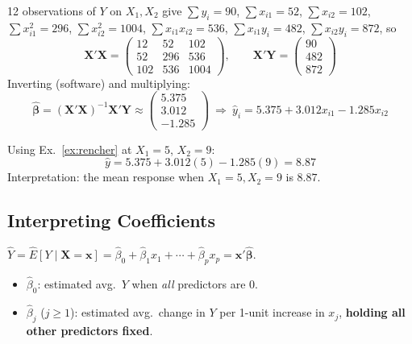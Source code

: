 \begin{example}\label{ex:rencher}
    12 observations of $Y$ on $X_1,X_2$ give
    $\sum y_i=90$, $\sum x_{i1}=52$, $\sum x_{i2}=102$,
    $\sum x_{i1}^2=296$, $\sum x_{i2}^2=1004$, $\sum x_{i1}x_{i2}=536$,
    $\sum x_{i1}y_i=482$, $\sum x_{i2}y_i=872$, so
    \[\mathbf{X}'\mathbf{X}=\begin{pmatrix}12&52&102\\52&296&536\\102&536&1004\end{pmatrix},
    \qquad \mathbf{X}'\mathbf{Y}=\begin{pmatrix}90\\482\\872\end{pmatrix}\]
    Inverting (software) and multiplying:
    \[\hat{\boldsymbol\beta}=(\mathbf{X}'\mathbf{X})^{-1}\mathbf{X}'\mathbf{Y}
    \approx\begin{pmatrix}5.375\\3.012\\-1.285\end{pmatrix}
    \ \Rightarrow\ \hat y_i = 5.375+3.012x_{i1}-1.285x_{i2}\]
\end{example}

\begin{example}[Prediction]
    Using Ex.\ \ref{ex:rencher} at $X_1=5$, $X_2=9$:
    \[\hat y = 5.375+3.012(5)-1.285(9) = 8.87\]
    Interpretation: the mean response when $X_1=5,X_2=9$ is $8.87$.
\end{example}

\subsection{Interpreting Coefficients}\label{def:interp}

\begin{definition}
    $\hat Y=\hat E[Y\mid\mathbf{X}=\mathbf{x}]=\hat\beta_0+\hat\beta_1x_1+\cdots+\hat\beta_px_p=\mathbf{x}'\hat{\boldsymbol\beta}$.
    \begin{itemize}
        \item $\hat\beta_0$: estimated avg.\ $Y$ when \emph{all}
        predictors are 0.
        \item $\hat\beta_j$ ($j\geq1$): estimated avg.\ change in $Y$
        per 1-unit increase in $x_j$, \textbf{holding all other
        predictors fixed}.
    \end{itemize}
\end{definition}

